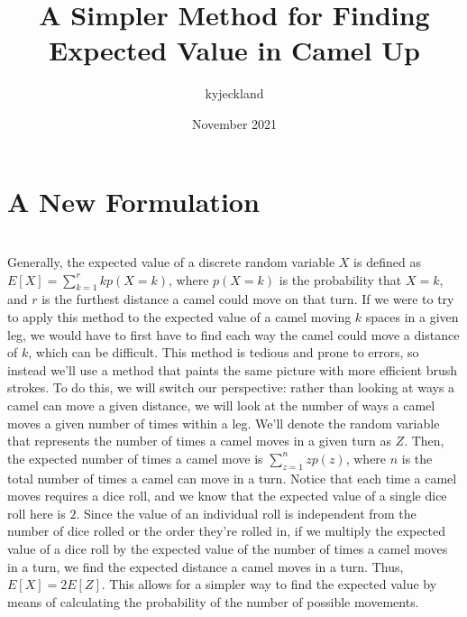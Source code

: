 \documentclass{article}
\title{A Simpler Method for Finding Expected Value in Camel Up}
\author{kyjeckland }
\date{November 2021}
\begin{document}
\maketitle

\section{A New Formulation}
\\ Generally, the expected value of a discrete random variable $X$ is defined as $E[X] = \sum_{k = 1}^{r}kp(X=k)$, where $p(X = k)$ is the probability that $X = k$, and $r$ is the furthest distance a camel could move on that turn. If we were to try to apply this method to the expected value of a camel moving $k$ spaces in a given leg, we would have to first have to find each way the camel could move a distance of $k$, which can be difficult. This method is tedious and prone to errors, so instead we'll use a method that paints the same picture with more efficient brush strokes. To do this, we will switch our perspective: rather than looking at ways a camel can move a given distance, we will look at the number of ways a camel moves a given number of times within a leg. We'll denote the random variable that represents the number of times a camel moves in a given turn as $Z$. Then, the expected number of times a camel move is $\sum_{z=1}^{n}zp(z)$, where $n$ is the total number of times a camel can move in a turn. Notice that each time a camel moves requires a dice roll, and we know that the expected value of a single dice roll here is $2$. Since the value of an individual roll is independent from the number of dice rolled or the order they're rolled in, if we multiply the expected value of a dice roll by the expected value of the number of times a camel moves in a turn, we find the expected distance a camel moves in a turn. Thus, $E[X] = 2E[Z]$. This allows for a simpler way to find the expected value by means of calculating the probability of the number of possible movements.
\end{document}
